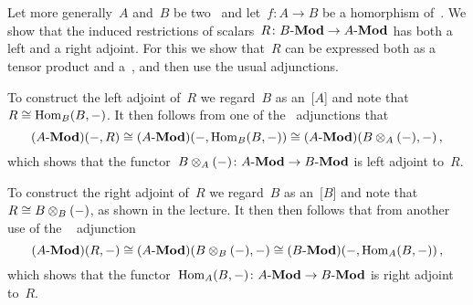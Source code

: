 \section{}





\subsection{}

Let more generally~$A$ and~$B$ be two~{\kalgs} and let~$f \colon A \to B$ be a homorphism of~{\kalgs}.
We show that the induced restrictions of scalars~$R \colon \text{$B$-$\mathbf{Mod}$} \to \text{$A$-$\mathbf{Mod}$}$ has both a left and a right adjoint.
For this we show that~$R$ can be expressed both as a tensor product and a~, and then use the usual \dash{$\tensor$}{$\Hom$} adjunctions.

To construct the left adjoint of~$R$ we regard~$B$ as an~{[$A$]} and note that~$R \cong \operatorname{Hom}_B(B, -)$.
It then follows from one of the~\dash{$\tensor$}{$\Hom$} adjunctions that
\[
        (\text{$A$-$\mathbf{Mod}$})(-, R)
  \cong (\text{$A$-$\mathbf{Mod}$})(-, \operatorname{Hom}_B(B, -))
  \cong (\text{$A$-$\mathbf{Mod}$})(B \otimes_A (-), -) \,,
\]
which shows that the functor~$B \otimes_A (-) \colon \text{$A$-$\mathbf{Mod}$} \to \text{$B$-$\mathbf{Mod}$}$ is left adjoint to~$R$.

To construct the right adjoint of~$R$ we regard~$B$ as an~{[$B$]} and note that~$R \cong B \otimes_B (-)$, as shown in the lecture.
It then then follows that from another use of the ~\dash{$\tensor$}{$\Hom$} adjunction
\[
        (\text{$A$-$\mathbf{Mod}$})(R, -)
  \cong (\text{$A$-$\mathbf{Mod}$})(B \otimes_B (-), -)
  \cong (\text{$B$-$\mathbf{Mod}$})(-, \operatorname{Hom}_A(B, -)) \,,
\]
which shows that the functor~$\operatorname{Hom}_A(B,-) \colon \text{$A$-$\mathbf{Mod}$} \to \text{$B$-$\mathbf{Mod}$}$ is right adjoint to~$R$.





\subsection{}

